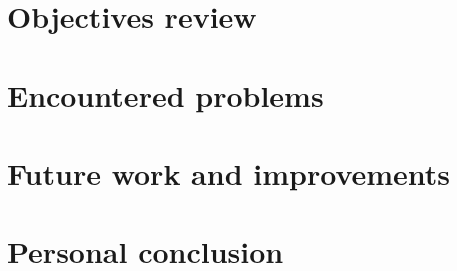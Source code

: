 \section{Objectives review}

\section{Encountered problems}

\section{Future work and improvements}




\section{Personal conclusion}

